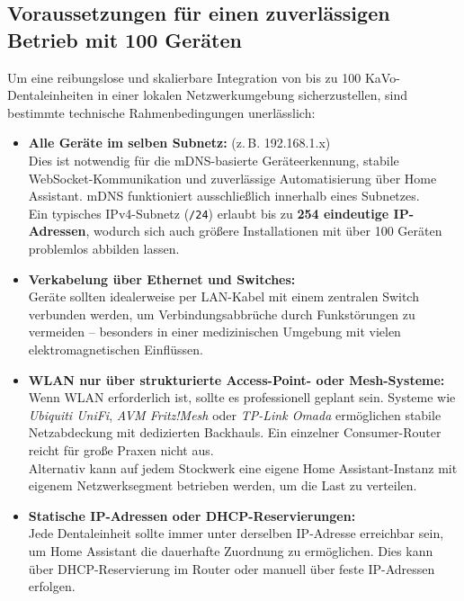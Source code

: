 \subsection{Voraussetzungen für einen zuverlässigen Betrieb mit 100 Geräten}

Um eine reibungslose und skalierbare Integration von bis zu 100 KaVo-Dentaleinheiten in einer lokalen Netzwerkumgebung sicherzustellen, sind bestimmte technische Rahmenbedingungen unerlässlich:

\begin{itemize}
    \item \textbf{Alle Geräte im selben Subnetz:} (z.\,B. 192.168.1.x)\\
    Dies ist notwendig für die mDNS-basierte Geräteerkennung, stabile WebSocket-Kommunikation und zuverlässige Automatisierung über Home Assistant. mDNS funktioniert ausschließlich innerhalb eines Subnetzes.\\
    Ein typisches IPv4-Subnetz (\texttt{/24}) erlaubt bis zu \textbf{254 eindeutige IP-Adressen}, wodurch sich auch größere Installationen mit über 100 Geräten problemlos abbilden lassen.\\

    \item \textbf{Verkabelung über Ethernet und Switches:}\\
    Geräte sollten idealerweise per LAN-Kabel mit einem zentralen Switch verbunden werden, um Verbindungsabbrüche durch Funkstörungen zu vermeiden – besonders in einer medizinischen Umgebung mit vielen elektromagnetischen Einflüssen.\\

    \item \textbf{WLAN nur über strukturierte Access-Point- oder Mesh-Systeme:}\\
    Wenn WLAN erforderlich ist, sollte es professionell geplant sein. Systeme wie \textit{Ubiquiti UniFi}, \textit{AVM Fritz!Mesh} oder \textit{TP-Link Omada} ermöglichen stabile Netzabdeckung mit dedizierten Backhauls. Ein einzelner Consumer-Router reicht für große Praxen nicht aus.\\
    
    Alternativ kann auf jedem Stockwerk eine eigene Home Assistant-Instanz mit eigenem Netzwerksegment betrieben werden, um die Last zu verteilen.\\

    \item \textbf{Statische IP-Adressen oder DHCP-Reservierungen:}\\
    Jede Dentaleinheit sollte immer unter derselben IP-Adresse erreichbar sein, um Home Assistant die dauerhafte Zuordnung zu ermöglichen. Dies kann über DHCP-Reservierung im Router oder manuell über feste IP-Adressen erfolgen.
\end{itemize}

